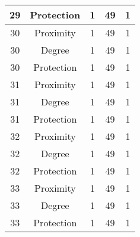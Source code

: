 \documentclass[results.tex]{subfiles}
\begin{document}
\begin{center}
\begin{tabular}{| c || c | c | c | c |}
            \hline
            29                      & Protection                   & 1                      & 49                      & 1                    \\
            \hline
            30                      & Proximity                    & 1                      & 49                      & 1                    \\
            \hline
            30                      & Degree                       & 1                      & 49                      & 1                    \\
            \hline
            30                      & Protection                   & 1                      & 49                      & 1                    \\
            \hline
            31                      & Proximity                    & 1                      & 49                      & 1                    \\
            \hline
            31                      & Degree                       & 1                      & 49                      & 1                    \\
            \hline
            31                      & Protection                   & 1                      & 49                      & 1                    \\
            \hline
            32                      & Proximity                    & 1                      & 49                      & 1                    \\
            \hline
            32                      & Degree                       & 1                      & 49                      & 1                    \\
            \hline
            32                      & Protection                   & 1                      & 49                      & 1                    \\
            \hline
            33                      & Proximity                    & 1                      & 49                      & 1                    \\
            \hline
            33                      & Degree                       & 1                      & 49                      & 1                    \\
            \hline
            33                      & Protection                   & 1                      & 49                      & 1                    \\

\end{tabular}
\end{center}
\end{document}
